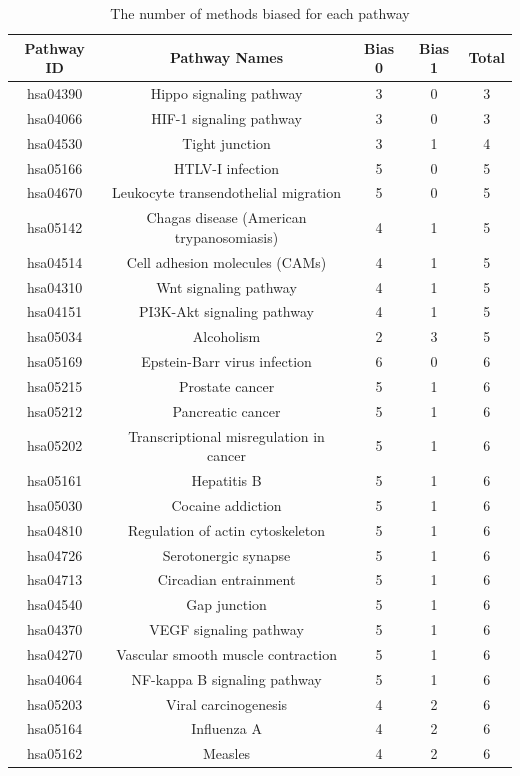 \clearpage
\begin{center}
\centering
\footnotesize
\begin{longtable}{@{}ccccc@{}}
\caption{The number of methods biased for each pathway\label{table:NrBiasedMethod}}\\
\hline
 \textbf{Pathway ID}& \textbf{Pathway Names} & \textbf{Bias 0} & \textbf{Bias 1} & \textbf{Total} \\
 \hline
hsa04390	&Hippo signaling pathway&	3&	0&	3\\
hsa04066	&HIF-1 signaling pathway&	3&	0&	3\\
hsa04530	&Tight junction&	3&	1&	4\\
hsa05166	&HTLV-I infection&	5&	0&	5\\
hsa04670	&Leukocyte transendothelial migration&	5&	0&	5\\
hsa05142	&Chagas disease (American trypanosomiasis)&	4&	1&	5\\
hsa04514	&Cell adhesion molecules (CAMs)&	4&	1&	5\\
hsa04310	&Wnt signaling pathway&	4&	1&	5\\
hsa04151	&PI3K-Akt signaling pathway&	4&	1&	5\\
hsa05034	&Alcoholism&	2&	3&	5\\
hsa05169	&Epstein-Barr virus infection&	6&	0&	6\\
hsa05215	&Prostate cancer&	5&	1&	6\\
hsa05212	&Pancreatic cancer&	5&	1&	6\\
hsa05202	&Transcriptional misregulation in cancer&	5&	1&	6\\
hsa05161	&Hepatitis B&	5&	1&	6\\
hsa05030	&Cocaine addiction&	5&	1&	6\\
hsa04810	&Regulation of actin cytoskeleton&	5&	1&	6\\
hsa04726	&Serotonergic synapse&	5&	1&	6\\
hsa04713	&Circadian entrainment&	5&	1&	6\\
hsa04540	&Gap junction&	5&	1&	6\\
hsa04370	&VEGF signaling pathway&	5&	1&	6\\
hsa04270	&Vascular smooth muscle contraction&	5&	1&	6\\
hsa04064	&NF-kappa B signaling pathway&	5&	1&	6\\
hsa05203	&Viral carcinogenesis&	4&	2&	6\\
hsa05164	&Influenza A&	4&	2&	6\\
hsa05162	&Measles	&4&	2&	6\\

\end{longtable}
\end{center}

